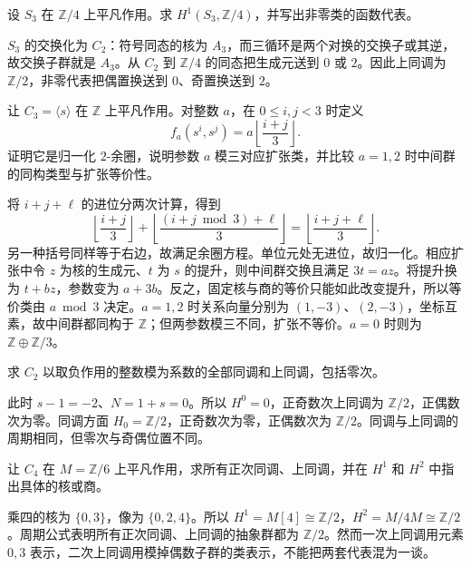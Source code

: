 \begin{exercise}\label{b4:ex:11-symmetric-first}
设 \(S_3\) 在 \(\mathbb Z/4\) 上平凡作用。求 \(H^1(S_3,\mathbb Z/4)\)，并写出非零类的函数代表。
\end{exercise}
\begin{solution}
\(S_3\) 的交换化为 \(C_2\)：符号同态的核为 \(A_3\)，而三循环是两个对换的交换子或其逆，故交换子群就是 \(A_3\)。从 \(C_2\) 到 \(\mathbb Z/4\) 的同态把生成元送到 \(0\) 或 \(2\)。因此上同调为 \(\mathbb Z/2\)，非零代表把偶置换送到 \(0\)、奇置换送到 \(2\)。
\end{solution}

\begin{exercise}\label{b4:ex:11-extension-carry}
让 \(C_3=\langle s\rangle\) 在 \(\mathbb Z\) 上平凡作用。对整数 \(a\)，在 \(0\le i,j<3\) 时定义
\[
f_a(s^i,s^j)=a\left\lfloor\frac{i+j}{3}\right\rfloor.
\]
证明它是归一化 \(2\)-余圈，说明参数 \(a\) 模三对应扩张类，并比较 \(a=1,2\) 时中间群的同构类型与扩张等价性。
\end{exercise}
\begin{solution}
将 \(i+j+\ell\) 的进位分两次计算，得到
\[
\left\lfloor\frac{i+j}{3}\right\rfloor+
\left\lfloor\frac{(i+j\bmod3)+\ell}{3}\right\rfloor
=\left\lfloor\frac{i+j+\ell}{3}\right\rfloor.
\]
另一种括号同样等于右边，故满足余圈方程。单位元处无进位，故归一化。相应扩张中令 \(z\) 为核的生成元、\(t\) 为 \(s\) 的提升，则中间群交换且满足 \(3t=az\)。将提升换为 \(t+bz\)，参数变为 \(a+3b\)。反之，固定核与商的等价只能如此改变提升，所以等价类由 \(a\bmod3\) 决定。\(a=1,2\) 时关系向量分别为 \((1,-3)\)、\((2,-3)\)，坐标互素，故中间群都同构于 \(\mathbb Z\)；但两参数模三不同，扩张不等价。\(a=0\) 时则为 \(\mathbb Z\oplus\mathbb Z/3\)。
\end{solution}

\begin{exercise}\label{b4:ex:11-sign-all-degrees}
求 \(C_2\) 以取负作用的整数模为系数的全部同调和上同调，包括零次。
\end{exercise}
\begin{solution}
此时 \(s-1=-2\)、\(N=1+s=0\)。所以 \(H^0=0\)，正奇数次上同调为 \(\mathbb Z/2\)，正偶数次为零。同调方面 \(H_0=\mathbb Z/2\)，正奇数次为零，正偶数次为 \(\mathbb Z/2\)。同调与上同调的周期相同，但零次与奇偶位置不同。
\end{solution}

\begin{exercise}\label{b4:ex:11-composite-coefficients}
让 \(C_4\) 在 \(M=\mathbb Z/6\) 上平凡作用，求所有正次同调、上同调，并在 \(H^1\) 和 \(H^2\) 中指出具体的核或商。
\end{exercise}
\begin{solution}
乘四的核为 \(\{0,3\}\)，像为 \(\{0,2,4\}\)。所以 \(H^1=M[4]\cong\mathbb Z/2\)，\(H^2=M/4M\cong\mathbb Z/2\)。周期公式表明所有正次同调、上同调的抽象群都为 \(\mathbb Z/2\)。然而一次上同调用元素 \(0,3\) 表示，二次上同调用模掉偶数子群的类表示，不能把两套代表混为一谈。
\end{solution}

